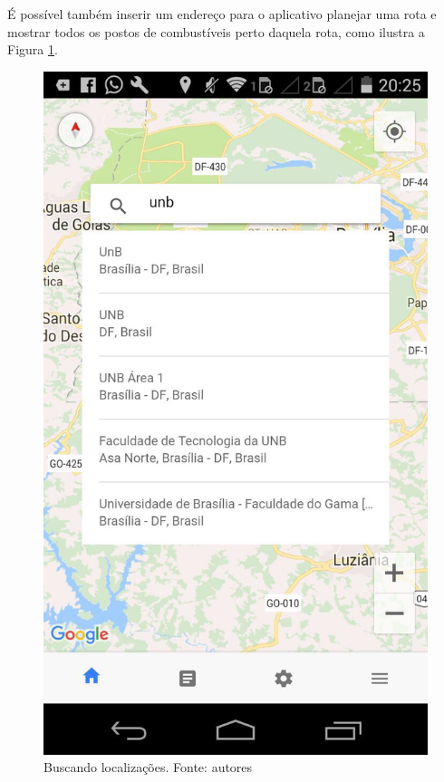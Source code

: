 É possível também inserir um endereço para o aplicativo planejar uma rota e mostrar todos os postos de combustíveis perto daquela rota, como ilustra a Figura \ref{img:buscando_localizacoes}.

\begin{figure}[H]
    \centering
    \includegraphics[scale=0.5]{figuras/app_3.jpg}
    \caption[Buscando localizações]{Buscando localizações. Fonte: autores}
    \label{img:buscando_localizacoes}
\end{figure}

